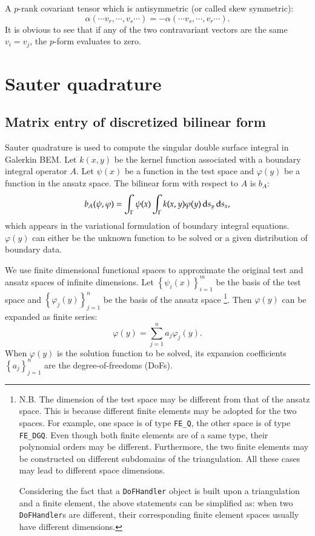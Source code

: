 \documentclass[11pt, a4paper]{book}
\begin{document}
\begin{Definition}
  A $p$-rank covariant tensor which is antisymmetric (or called skew symmetric):
  $$
  \alpha(\cdots v_r, \cdots, v_s \cdots) = -\alpha(\cdots v_s, \cdots, v_r \cdots).
  $$
  It is obvious to see that if any of the two contravariant vectors are the
  same $v_i = v_j$, the $p$-form evaluates to zero.
\end{Definition}


\chapter{Sauter quadrature}
\label{sec:sauter-quad}

\section{Matrix entry of discretized bilinear form}

Sauter quadrature is used to compute the singular double surface integral in Galerkin BEM.
Let $k(x,y)$ be the kernel function associated with a boundary integral operator $A$. Let
$\psi(x)$ be a function in the test space and $\varphi(y)$ be a function in the ansatz
space. The bilinear form with respect to $A$ is $b_A$:
\begin{equation}
  \label{eq:bem-bilinear-form-general}
  b_A(\psi, \varphi) = \int_{\Gamma}\psi(x)\int_{\Gamma}k(x,y)\varphi(y) \,\mathrm{d} s_y \,\mathrm{d} s_x,
\end{equation}
which appears in the variational formulation of boundary integral equations. $\varphi(y)$
can either be the unknown function to be solved or a given distribution of boundary data.

We use finite dimensional functional spaces to approximate the original test and ansatz
spaces of infinite dimensions. Let $\left\{ \psi_i(x) \right\}_{i=1}^m$ be the basis of
the test space and $\left\{ \varphi_j(y) \right\}_{j=1}^n$ be the basis of the ansatz
space \footnote{N.B. The dimension of the test space may be different from that of the ansatz
  space. This is because different finite elements may be adopted for the two spaces. For
  example, one space is of type \texttt{FE\_Q}, the other space is of type
  \texttt{FE\_DGQ}. Even though both finite elements are of a same type, their polynomial
  orders may be different. Furthermore, the two finite elements may be constructed on
  different subdomains of the triangulation. All these cases may lead to different space
  dimensions.

  Considering the fact that a \texttt{DoFHandler} object is built upon a triangulation and
  a finite element, the above statements can be simplified as: when two
  \texttt{DoFHandler}s are different, their corresponding finite element spaces usually
  have different dimensions.}. Then $\varphi(y)$ can be expanded as finite series:
\begin{equation}
  \varphi(y) = \sum_{j=1}^n a_j\varphi_j(y).
\end{equation}
When $\varphi(y)$ is the solution function to be solved, its expansion coefficients
$\left\{ a_j \right\}_{j=1}^n$ are the degree-of-freedoms (DoFs).
\end{document}
